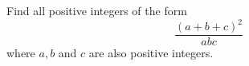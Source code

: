 Find all positive integers of the form
$$\frac{(a+b+c)^2}{abc}$$
where $a,b$ and $c$ are also positive integers.
